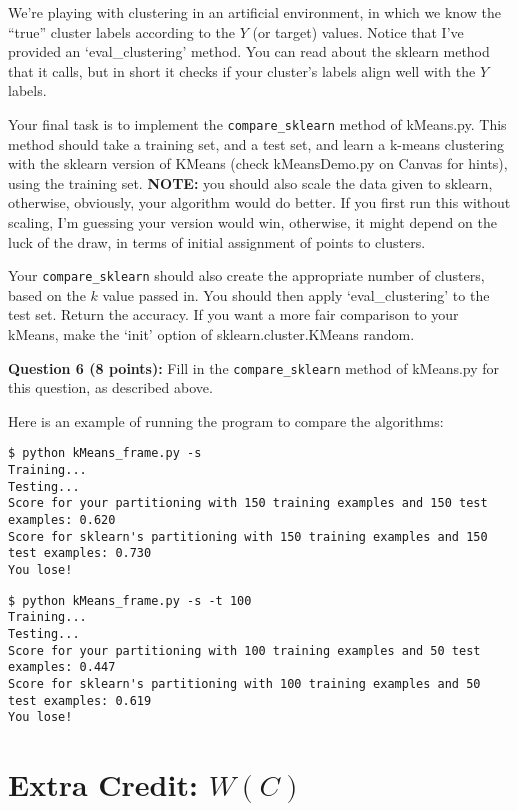 \documentclass[11pt]{article}
\begin{document}
We're playing with clustering in an artificial environment, in which we know the ``true''
cluster labels according to the $Y$ (or target) values. 
Notice that I've provided an `eval\_clustering' method. You can read about the sklearn method that it calls, but in short it checks if your cluster's labels align well with the $Y$ labels.

Your final task is to implement the \texttt{compare\_sklearn} method of kMeans.py. This method should take a training set, and a test set, and learn a k-means clustering with the sklearn version of KMeans (check kMeansDemo.py on Canvas for hints), using the training set. \textbf{NOTE:} you 
should also scale the data given to sklearn, otherwise, obviously, your algorithm would do better.
If you first run this without scaling, I'm guessing your version would win, otherwise, it might 
depend on the luck of the draw, in terms of initial assignment of points to clusters.

Your \texttt{compare\_sklearn} should also create the appropriate number of clusters, based on the $k$ value passed in.
You should then apply `eval\_clustering' to the test set. Return the accuracy.
If you want a more fair comparison to your kMeans, make the `init' option of sklearn.cluster.KMeans random.

\textbf{Question 6 (8 points):} Fill in the \texttt{compare\_sklearn} method of kMeans.py for this question, as described above.

Here is an example of running the program to compare the algorithms:

\begin{verbatim}
$ python kMeans_frame.py -s 
Training...
Testing...
Score for your partitioning with 150 training examples and 150 test examples: 0.620 
Score for sklearn's partitioning with 150 training examples and 150 test examples: 0.730 
You lose!
\end{verbatim}

\begin{verbatim}
$ python kMeans_frame.py -s -t 100
Training...
Testing...
Score for your partitioning with 100 training examples and 50 test examples: 0.447 
Score for sklearn's partitioning with 100 training examples and 50 test examples: 0.619 
You lose!
\end{verbatim}

\section{Extra Credit: $W(C)$}
\end{document}
